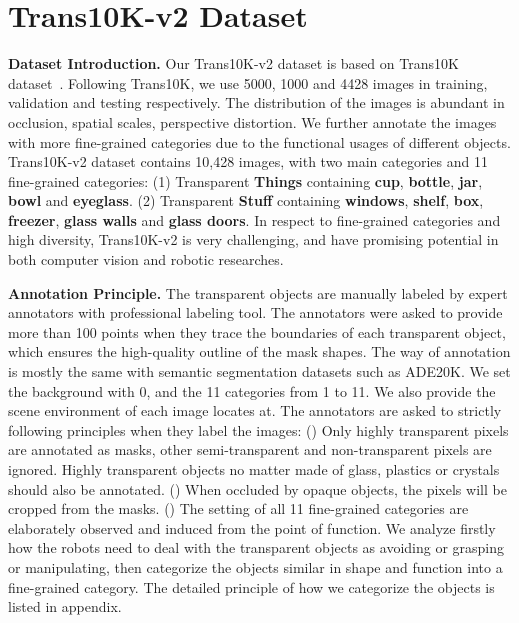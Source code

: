 \documentclass{article}
\begin{document}
\section{Trans10K-v2 Dataset}
\textbf{Dataset Introduction.}
Our Trans10K-v2 dataset is based on Trans10K dataset~\cite{translab}. 
Following Trans10K, we use 5000, 1000 and 4428 images in training, validation and testing respectively. The distribution of the images is abundant in occlusion, spatial scales, perspective distortion. We further annotate the images with more fine-grained categories due to the functional usages of different objects.
Trans10K-v2 dataset contains 10,428 images, with two main categories and 11 fine-grained categories: (1) Transparent \textbf{Things} containing \textbf{cup}, \textbf{bottle}, \textbf{jar}, \textbf{bowl} and \textbf{eyeglass}. (2) Transparent \textbf{Stuﬀ} containing \textbf{windows}, \textbf{shelf}, \textbf{box}, \textbf{freezer}, \textbf{glass walls} and \textbf{glass doors}. 
In respect to ﬁne-grained categories and high diversity, Trans10K-v2 is very challenging, and have promising potential in both computer vision and robotic researches.




\textbf{Annotation Principle.}
The transparent objects are manually labeled by expert annotators with professional labeling tool. The annotators were asked to provide more than 100 points when they trace the boundaries of each transparent object, which ensures the high-quality outline of the mask shapes. The way of annotation is mostly the same with semantic segmentation datasets such as ADE20K. We set the background with 0, and the 11 categories from 1 to 11. We also provide the scene environment of each image locates at. The annotators are asked to strictly following principles when they label the images: (\uppercase\expandafter{}) Only highly transparent pixels are annotated as masks, other semi-transparent and non-transparent pixels are ignored. 
Highly transparent objects no matter made of glass, plastics or crystals should also be annotated. (\uppercase\expandafter{}) When occluded by opaque objects, the pixels will be cropped from the masks. (\uppercase\expandafter{}) 
The setting of all 11 fine-grained categories are elaborately observed and induced from the point of function. 
We analyze firstly how the robots need to deal with the transparent objects as avoiding or grasping or manipulating, then categorize the objects similar in shape and function into a fine-grained category.
The detailed principle of how we categorize the objects is listed in appendix.
\end{document}
